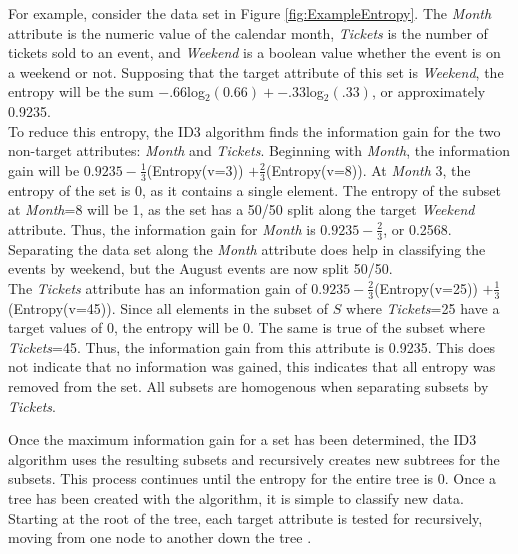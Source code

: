 For example, consider the data set in Figure \ref{fig:ExampleEntropy}. The \textit{Month} attribute is the numeric value of the calendar month, \textit{Tickets} is the number of tickets sold to an event, and \textit{Weekend} is a boolean value whether the event is on a weekend or not. Supposing that the target attribute of this set is \textit{Weekend}, the entropy will be the sum $-.66$log$_2(0.66) + -.33$log$_2(.33)$, or approximately 0.9235.\\

To reduce this entropy, the ID3 algorithm finds the information gain for the two non-target attributes: \textit{Month} and \textit{Tickets}. Beginning with \textit{Month}, the information gain will be $0.9235 - \frac{1}{3}$(Entropy(v=3)) $+ \frac{2}{3}$(Entropy(v=8)). At \textit{Month} 3, the entropy of the set is 0, as it contains a single element. The entropy of the subset at \textit{Month}=8 will be 1, as the set has a 50/50 split along the target \textit{Weekend} attribute. Thus, the information gain for \textit{Month} is $0.9235 - \frac{2}{3}$, or 0.2568. Separating the data set along the \textit{Month} attribute does help in classifying the events by weekend, but the August events are now split 50/50.\\

The \textit{Tickets} attribute has an information gain of $0.9235 - \frac{2}{3}$(Entropy(v=25)) $+ \frac{1}{3}$(Entropy(v=45)). Since all elements in the subset of $S$ where \textit{Tickets}=25 have a target values of 0, the entropy will be 0. The same is true of the subset where \textit{Tickets}=45. Thus, the information gain from this attribute is 0.9235. This does not indicate that no information was gained, this indicates that all entropy was removed from the set. All subsets are homogenous when separating subsets by \textit{Tickets}.

Once the maximum information gain for a set has been determined, the ID3 algorithm uses the resulting subsets and recursively creates new subtrees for the subsets. This process continues until the entropy for the entire tree is 0. Once a tree has been created with the algorithm, it is simple to classify new data. Starting at the root of the tree, each target attribute is tested for recursively, moving from one node to another down the tree \cite{sega07}.\\

